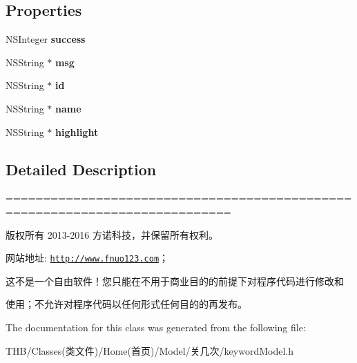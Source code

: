 \subsection*{Properties}
\begin{DoxyCompactItemize}
\item 
\mbox{\label{interfacekeyword_model_a87d3e708f1f057b56c84388bf1d0e9e2}} 
N\+S\+Integer {\bfseries success}
\item 
\mbox{\label{interfacekeyword_model_a5170de0bd4ad1ca90a1200bd7a312da0}} 
N\+S\+String $\ast$ {\bfseries msg}
\item 
\mbox{\label{interfacekeyword_model_a0416e9239d71e459846f36983f33d863}} 
N\+S\+String $\ast$ {\bfseries id}
\item 
\mbox{\label{interfacekeyword_model_a6af4d9fb59526feabf66af6aff9c647c}} 
N\+S\+String $\ast$ {\bfseries name}
\item 
\mbox{\label{interfacekeyword_model_a143b791e02901ba62bbf67f7f2ca4054}} 
N\+S\+String $\ast$ {\bfseries highlight}
\end{DoxyCompactItemize}


\subsection{Detailed Description}
============================================================================

版权所有 2013-\/2016 方诺科技，并保留所有权利。

网站地址\+: \href{http://www.fnuo123.com}{\tt http\+://www.\+fnuo123.\+com}； 



这不是一个自由软件！您只能在不用于商业目的的前提下对程序代码进行修改和

使用；不允许对程序代码以任何形式任何目的的再发布。 

 

The documentation for this class was generated from the following file\+:\begin{DoxyCompactItemize}
\item 
T\+H\+B/\+Classes(类文件)/\+Home(首页)/\+Model/关几次/keyword\+Model.\+h\end{DoxyCompactItemize}
